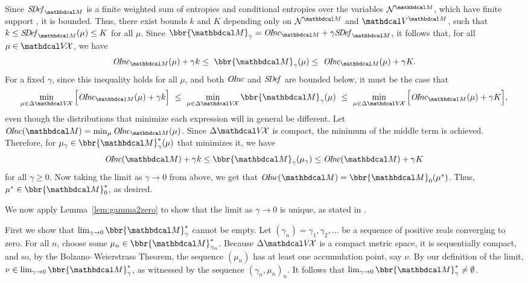 \begin{subappendices}
\begin{lproof}
Since $\SDef_{\dg M}$ is a finite weighted sum of entropies
and conditional entropies over the variables $\N^{\dg M}$, which have
finite support%
, it is bounded.
Thus, there exist bounds $k$ and $K$ depending only on $\N^{\dg M}$ and
$\V^{\dg M}$, such that $\lb \leq \SDef_{\dg M}(\mu) \leq \ub$ for all $\mu$.
Since $\bbr{\dg M}_\gamma = \OInc_{\dg M} + \gamma \SDef_{\dg M}$,
it follows that, for all $\mu \in \V\!\X$, we have
\[ \OInc_{\dg M}( \mu) + \gamma\lb \leq~ \bbr{\dg M }_\gamma(\mu) 
\leq~  \OInc_{\dg M}( \mu) + \gamma\ub. \]
For a fixed $\gamma$, since this inequality holds for all $\mu$, and
both $\mathit{O\mskip-2.5muI\mskip-3.5mun\mskip-1.7muc}$ and $\mathit{S\mskip-3.5muD\mskip-2.5mue\mskip-1.5muf}$ are bounded below, it must be the case that  
\[
\min_{\mu \in \Delta\V\!\X} \Big[ \OInc_{\dg M}( \mu) + \gamma\lb \Big]
~\leq~ \min_{\mu \in \Delta\V\!\X}\bbr{\dg M }_\gamma(\mu) ~\leq~
\min_{\mu \in \Delta\V\!\X} \Big[ \OInc_{\dg M}( \mu) + \gamma\ub
    \Big], \] 
even though the distributions that minimize each expression will in general be different.
Let $\OInc(\dg M) = \min_{\mu} \OInc_{\dg M}(\mu)$.
Since $\Delta\V\!\X$ is compact, the minimum of the middle term is
achieved.  
Therefore, for $\mu_\gamma \in \bbr{\dg M}^*_\gamma(\mu)$ that
minimizes it, we have 
$$\OInc(\dg M) +\gamma \lb \le \bbr{\dg M }_\gamma(\mu_\gamma) \le
		 \OInc(\dg M) +\gamma \ub$$ for all $\gamma \ge 0.$
Now taking the limit as $\gamma\rightarrow 0$ from above, we get that
$\OInc(\dg M) = \bbr{\dg M }_0(\mu^*)$.
Thus, $\mu^* \in \bbr{\dg M}_0^*$, as desired.
\end{lproof}

We now apply Lemma~\ref{lem:gamma2zero} to show that the limit as
$\gamma \to 
0$ is unique, as stated in . 
\begin{lproof}\label{proof:limit-uniq}
First we show that $\lim_{\gamma \to 0}\bbr{\dg M}_\gamma^*$ cannot be empty.
Let $(\gamma_n) = \gamma_1, \gamma_2, \ldots$ be a sequence of
positive reals 
converging to zero.  For all $n$, choose some $\mu_n \in \bbr{\dg
M}_{\gamma_n}^*$. Because $\Delta\V\!\X$ is a compact metric
space, it is sequentially compact, and so, by the
Bolzano–Weierstrass Theorem, the sequence $(\mu_n)$ has at least one
accumulation point, say $\nu$. By our definition of the limit, $\nu \in
\lim_{\gamma\to0}\bbr{\dg M}_\gamma^*$, as witnessed by the sequence
$(\gamma_n, \mu_n)_n$.  It follows that $\lim_{\gamma\to0}\bbr{\dg
  M}_\gamma^* \ne \emptyset$.


\end{lproof}
\end{subappendices}
